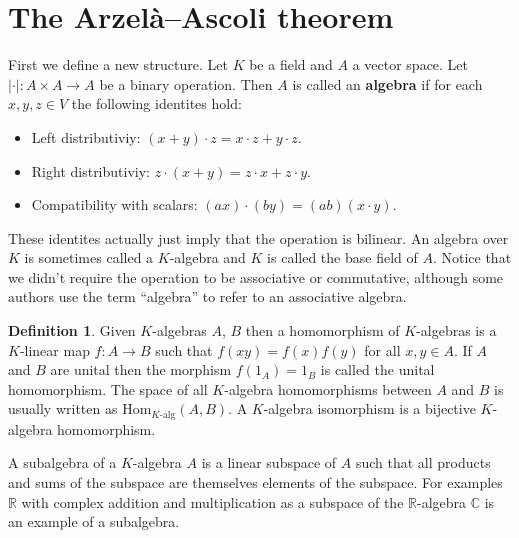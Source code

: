 \documentclass[11pt,a4paper]{article}
\theoremstyle{definition}
\newtheorem{definition}{Definition}[section]
\theoremstyle{plain}
\newcommand{\R}{\mathbb{R}}
\newcommand{\C}{\mathbb{C}}
\begin{document}
  \section{The Arzelà–Ascoli theorem}\label{sec:the-AA-theorem}
  First we define a new structure. Let $K$ be a field and $A$ a vector 
  space. Let $|\cdot| \colon A \times A \to A$ be a binary operation.
  Then $A$ is called an \textbf{algebra} if for each $x,y,z \in V$ 
  the following identites hold:
  \begin{itemize}
    \item Left distributiviy: $(x + y) \cdot z = x \cdot z + y \cdot z$.
    \item Right distributiviy: $z \cdot (x + y) = z \cdot x + z \cdot y$.
    \item Compatibility with scalars: 
    $(ax) \cdot (by) = (ab) (x \cdot y)$.
  \end{itemize}
  These identites actually just imply that the operation is bilinear.
  An algebra over $K$ is sometimes called a $K$-algebra and $K$ is
  called the base field of $A$. Notice that we didn't require the operation
  to be associative or commutative, although some authors use the term
  ``algebra'' to refer to an associative algebra.
  \begin{definition}
    Given $K$-algebras $A$, $B$ then a homomorphism of $K$-algebras
    is a $K$-linear map $f \colon A \to B$ such that $f(xy)=f(x)f(y)$
    for all $x,y \in A$. If $A$ and $B$ are unital then the morphism
    $f(1_A) = 1_B$ is called the unital homomorphism. The space
    of all $K$-algebra homomorphisms between $A$ and $B$ is usually 
    written as ${\mathrm{Hom}}_{K\text{-alg}}(A,B)$. A $K$-algebra
    isomorphism is a bijective $K$-algebra homomorphism.
  \end{definition}
  A subalgebra of a $K$-algebra $A$ is a linear subspace of $A$ such
  that all products and sums of the subspace are themselves elements
  of the subspace. For examples $\R$ with complex addition and 
  multiplication as a subspace of the $\R$-algebra $\C$ is an example
  of a subalgebra.
\end{document}
